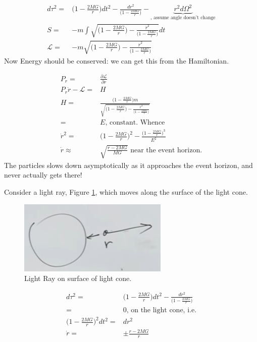 \documentclass[]{article}
\newcommand{\Lagr}{\mathscr{L}}
\begin{document}
{\begin{align*}
d \tau^2 =& \bigg(1-\frac{2 MG}{ r}\bigg) dt^2 - \frac{dr^2}{\bigg(1-\frac{2 MG}{ r}\bigg)} - \underbrace{ r^2 d\Omega^2}_\text{, assume angle doesn't change}\\
S =& -m \int \sqrt{\big(1-\frac{2 MG}{ r}\big)  - \frac{\dot{r}^2}{\big(1-\frac{2 MG}{ r}\big)}} dt\\
\Lagr  =& -m \sqrt{\big(1-\frac{2 MG}{ r}\big)  - \frac{\dot{r}^2}{\big(1-\frac{2 MG}{ r}\big)}} 
\end{align*}
Now Energy should be conserved: we can get this from the Hamiltonian.

\begin{align*}
	P_r =& \frac{\partial \Lagr}{\partial r}\\
	P_r \dot{r} - \Lagr =& H\\
	H =& \frac{\big(1-\frac{2MG}{r}\big)m}{\sqrt{\big(1-\frac{2 MG}{ r}\big)  - \frac{\dot{r}^2}{\big(1-\frac{2 MG}{ r}\big)}}}\\
	=& E \text{, constant. Whence}\\
	\dot{r}^2 =& \big(1-\frac{2MG}{r}\big)^2- \frac{\big(1-\frac{2MG}{r}\big)^3}{E^2}\\
	\dot{r} \approx & \sqrt{\frac{r-2MG}{MG}} \text{ near the event horizon.}
\end{align*}
The particles slows down asymptotically as it approaches the event horizon, and never actually gets there!

Consider a light ray, Figure \ref{fig:gr-5-lightray}, which moves along the surface of the light cone.
 
\begin{figure}[H]
	\caption{Light Ray on surface of light cone.}\label{fig:gr-5-lightray}
	\includegraphics{gr-5-lightray}
\end{figure}

\begin{align*}
	d \tau^2 =& \bigg(1-\frac{2 MG}{ r}\bigg) dt^2 - \frac{dr^2}{\bigg(1-\frac{2 MG}{ r}\bigg)}\\
	=& 0 \text{, on the light cone, i.e.}\\
	\bigg(1-\frac{2 MG}{ r}\bigg)^2 dt^2 =& dr^2\\
	\dot{r} =& \pm \frac{r-2MG}{r}
\end{align*}

}
\end{document}
